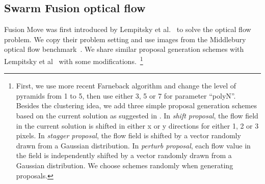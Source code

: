 \subsection{Swarm Fusion optical flow}

Fusion Move was first introduced by Lempitsky et al.~\cite{fusion_flow} to
solve the optical flow problem.
We copy their problem setting and use images from the Middlebury optical
flow benchmark~\cite{middlebury_optical_flow}. We share similar proposal
generation schemes with Lempitsky et al~\cite{fusion_flow}
 with some modifications.~\footnote{First, we use more recent
   Farneback algorithm and change the level of pyramids from 1 to 5,
   then use either 3, 5 or 7 for parameter ``polyN''. Besides the
   clustering idea, we add three simple proposal generation schemes
   based on the current solution as suggested in
   \cite{fusion_flow}. In \textit{shift proposal}, the flow field in
   the current solution is shifted in either x or y directions for
   either 1, 2 or 3 pixels. In \textit{stagger proposal}, the flow
   field is shifted by a vector randomly drawn from a Gaussian
   distribution. In \textit{perturb proposal}, each flow value in the
   field is independently shifted by a vector randomly drawn from a
   Gaussian distribution. We choose schemes randomly when generating
   proposals.}


